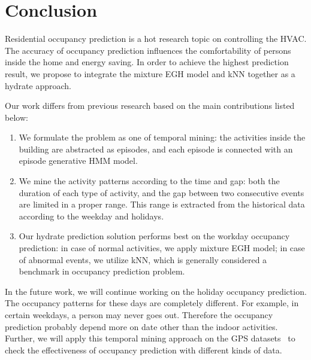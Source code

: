 \section{Conclusion}
Residential occupancy prediction is a hot research topic on controlling the HVAC. 
The accuracy of occupancy prediction influences the comfortability of persons inside 
the home and energy saving. 
In order to achieve the highest prediction result, 
we propose to integrate the mixture EGH model and 
kNN together as a hydrate approach.

Our work differs from previous research based on the main contributions listed below:
\begin{enumerate}
\item We formulate the problem as one of temporal mining: the activities inside the building are abstracted as episodes, and each episode is connected with an episode generative HMM model.
\item We mine the activity patterns according to the time and gap: both the duration of each type of 
activity, and the gap between two consecutive events are limited in a proper range. 
This range is extracted from the historical data according to the weekday and holidays.
\item Our hydrate prediction solution performs best on the workday occupancy prediction: 
in case of normal activities, we apply mixture EGH model; 
in case of abnormal events, we utilize kNN,  
which is generally considered a benchmark in occupancy prediction problem. 
\end{enumerate}

In the future work, we will continue working on the holiday occupancy prediction. 
The occupancy patterns for these days are completely different. 
For example, in certain weekdays, a person may never goes out. 
Therefore the occupancy prediction probably depend more on date other than the indoor activities. 
Further, we will apply this temporal mining approach on the GPS datasets~\cite{koehler2013therml}
to check the effectiveness of occupancy prediction with different kinds of data. 
